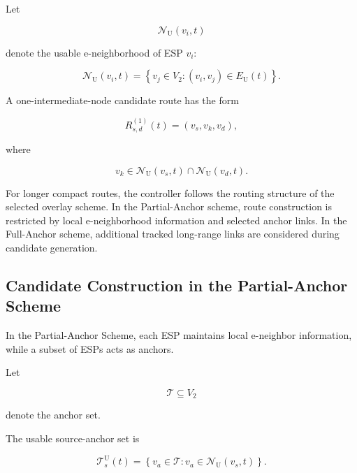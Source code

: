 Let

\begin{equation}
    \mathcal{N}_{\mathrm{U}}(v_i,t)
\end{equation}

denote the usable e-neighborhood of ESP $v_i$:

\begin{equation}
    \mathcal{N}_{\mathrm{U}}(v_i,t)
    =
    \left\{
    v_j
    \in
    V_2
    :
    (v_i,v_j)
    \in
    E_{\mathrm{U}}(t)
    \right\}.
\end{equation}

A one-intermediate-node candidate route has the form

\begin{equation}
    R_{s,d}^{(1)}(t)
    =
    \left(
    v_s,
    v_k,
    v_d
    \right),
\end{equation}

where

\begin{equation}
    v_k
    \in
    \mathcal{N}_{\mathrm{U}}(v_s,t)
    \cap
    \mathcal{N}_{\mathrm{U}}(v_d,t).
\end{equation}

For longer compact routes, the controller follows the routing structure of the selected overlay scheme. In the Partial-Anchor scheme, route construction is restricted by local e-neighborhood information and selected anchor links. In the Full-Anchor scheme, additional tracked long-range links are considered during candidate generation.

\subsection{Candidate Construction in the Partial-Anchor Scheme}

In the Partial-Anchor Scheme, each ESP maintains local e-neighbor information, while a subset of ESPs acts as anchors.

Let

\begin{equation}
    \mathcal{T}
    \subseteq
    V_2
\end{equation}

denote the anchor set.

The usable source-anchor set is

\begin{equation}
    \mathcal{T}_{s}^{\mathrm{U}}(t)
    =
    \left\{
    v_a
    \in
    \mathcal{T}
    :
    v_a
    \in
    \mathcal{N}_{\mathrm{U}}(v_s,t)
    \right\}.
\end{equation}

